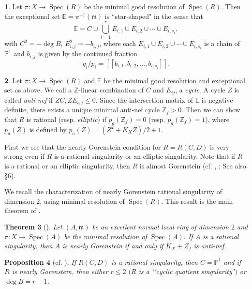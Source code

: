\documentclass[12pt]{amsart}
\newtheorem{thm}{Theorem}[section]
\newtheorem{prop}[thm]{Proposition}
\theoremstyle{definition}
\newtheorem{noname}[thm]{}
\theoremstyle{remark}
\numberwithin{equation}{section}
\DeclareMathOperator{\Spec}{Spec}
\newcommand{\m}{\mathfrak m}
\newcommand{\PP}{\mathbb P}
\newcommand{\bbE}{\mathbb E}
\newcommand{\Z}{\mathbb Z}
\renewcommand{\:}{\colon}
\begin{document}
\begin{noname}\label{star-resol} 
Let $\pi: X\to \Spec(R)$ be the  minimal good  resolution of $\Spec(R)$. 
Then the exceptional set $\bbE = \pi^{-1}(\m)$ is 
``star-shaped" in the sense that 
\[
\bbE = C \cup \bigcup_{i=1}^r E_{i,1}\cup E_{i,2}\cup \cdots  \cup  E_{i,s_i},
\]
with $C^2= - \deg B$, $E_{i,j}^2 = - b_{i,j}$, where each  
$E_{i,1}\cup E_{i,2}\cup \cdots  \cup E_{i,s_i}$ is a chain of $\PP^1$ 
and $b_{i,j}$ is given by the continued fraction
\[
q_i/p_i = [[b_{i,1}, b_{i,2}, \ldots , b_{i, s_i}]]. 
\] 
\end{noname}

\begin{noname}\label{pa(Z)} 
Let  $\pi: X\to \Spec(R)$ and $\bbE$ be the  
minimal good resolution and exceptional set as above. 
We call  a $\Z$-linear combination of $C$ and 
$E_{ij}$, a {\em cycle}.  
A cycle $Z$ is called {\em anti-nef} if $Z C, Z E_{i,j} \le 0$. 
Since the intersection matrix of $\bbE$ is negative definite, 
there exists  a unique minimal anti-nef cycle 
 $\Z_f  >0$. 
 Then we can show that $R$ is rational 
 (resp. {\em elliptic}) if  $p_a(\Z_f) =0$ (resp. $p_a(\Z_f)=1$), 
where $p_a(Z)$ is defined by $p_a(Z)=(Z^2+K_XZ)/2 +1$.    
\end{noname}



\par 
First we see that  the nearly Gorenstein condition  
for $R=R(C,D)$ is  very strong even if 
$R$ is a rational singularity or an elliptic singularity.
Note that if $R$ is a rational or an elliptic singularity, 
then $R$ is almost Gorenstein (cf. \cite{GTT}, \cite{OWYaG}; 
See also \S 6).
\par
We recall the characterization of nearly Gorenstein rational singularity of dimension $2$, 
using minimal resolution of $\Spec(R)$. 
This result is the main theorem of 
\cite{MOWY}.

\begin{thm}[\textrm{\cite[Theorem 4.2]{MOWY}}] \label{Zf-antinef} 
Let $(A,\m)$ be an excellent normal local ring of dimension $2$ 
and $\pi: X\to \Spec(A)$ be the minimal resolution of $\Spec(A)$. 
If $A$ is a rational singularity, then $A$ is nearly Gorenstein if and only if 
$K_X + Z_f$  is anti-nef.
\end{thm}

\begin{prop}[\textrm{cf. \cite[Theorem 4.2]{MOWY}}]
\label{R(C,D)rational}  
If $R(C,D)$ is a rational singularity, then 
$C= \PP^1$ and if $R$ is nearly Gorenstein, then 
either $r\le 2$ $($$R$ is a \lq\lq cyclic quotient singularity"$)$ 
or $\deg B = r-1$. 
\end{prop}
\end{document}
